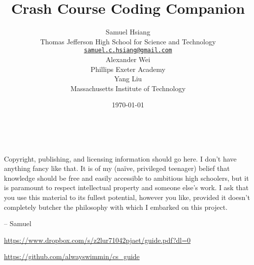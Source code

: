 \title{Crash Course Coding Companion}
\author{
Samuel Hsiang \\ 
Thomas Jefferson High School for Science and Technology \\ 
\href{mailto:samuel.c.hsiang@gmail.com}{\texttt{\textup{samuel.c.hsiang@gmail.com}}} \\
\vspace{.7em}
Alexander Wei \\
Phillips Exeter Academy \\
Yang Liu \\
Massachusetts Institute of Technology
}
\date{\today}

\maketitle

\newpage
~\vfill
\thispagestyle{empty}


\noindent Copyright, publishing, and licensing information should go here. I don't have anything fancy like that. It is of my (na\"{i}ve, privileged teenager) belief that knowledge should be free and easily accessible to ambitious high schoolers, but it is paramount to respect intellectual property and someone else's work. I ask that you use this material to its fullest potential, however you like, provided it doesn't completely butcher the philosophy with which I embarked on this project.

\begin{flushright}
-- Samuel
\end{flushright}



\noindent \url{https://www.dropbox.com/s/z2lur71042pjaet/guide.pdf?dl=0}

\noindent \url{https://github.com/alwayswimmin/cs_guide}



\newpage
\thispagestyle{empty}
